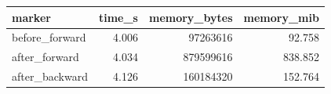 \begin{tabular}{lrrr}
\toprule
marker & time\_s & memory\_bytes & memory\_mib \\
\midrule
before\_forward & 4.006 & 97263616 & 92.758 \\
after\_forward & 4.034 & 879599616 & 838.852 \\
after\_backward & 4.126 & 160184320 & 152.764 \\
\bottomrule
\end{tabular}
